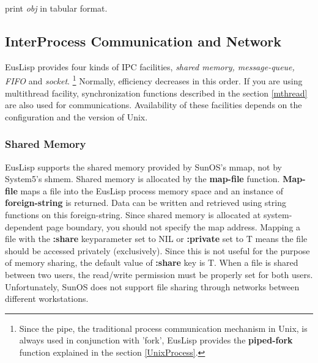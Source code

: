 \begin{refdesc}




{print {\em obj} in tabular format.}



\end{refdesc}

\newpage

\subsection{InterProcess Communication and Network}\label{IPC}

EusLisp provides four kinds of IPC facilities,
{\em shared memory, message-queue, FIFO} and {\em socket}.
\footnote{Since the pipe, the traditional process communication
mechanism in Unix, is always used in conjunction with 'fork',
EusLisp provides the {\bf piped-fork} function explained in the section
\ref{UnixProcess}.}
Normally,  efficiency decreases in this order.
If you are using multithread facility, synchronization functions
described in the section \ref{mthread} are also used for communications.
Availability of these facilities depends on the configuration and
the version of Unix.

\subsubsection{Shared Memory}
EusLisp supports the shared memory provided by SunOS's mmap,
not by System5's shmem.
Shared memory is allocated by the {\bf map-file} function.
{\bf Map-file} maps a file into the EusLisp process memory space
and an instance of {\bf foreign-string} is returned.
Data can be written and retrieved using string functions on this
foreign-string.
Since shared memory is allocated at system-dependent page boundary, 
you should not specify the map address.
Mapping a file with the {\bf :share} keyparameter set to NIL
or {\bf :private} set to T
means the file should be accessed privately (exclusively).
Since this is not useful for the purpose of memory sharing,
the default value of {\bf :share} key is T.
When a file is shared between two users, the read/write permission
must be properly set for both users.
Unfortunately, SunOS does not support file sharing through networks 
between different workstations.

